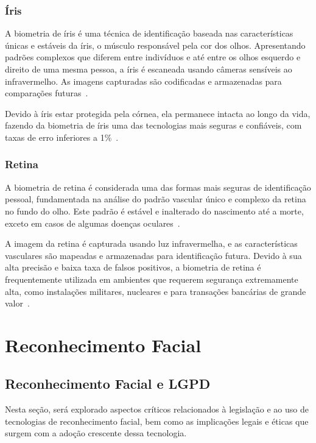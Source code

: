 \subsubsection{Íris}\label{subsubsec:iris}
A biometria de íris é uma técnica de identificação baseada nas características únicas e estáveis da íris, o músculo responsável pela cor dos olhos.
Apresentando padrões complexos que diferem entre indivíduos e até entre os olhos esquerdo e direito de uma mesma pessoa, a íris é escaneada usando câmeras sensíveis ao infravermelho.
As imagens capturadas são codificadas e armazenadas para comparações futuras~\cite{de2020biometria}.

Devido à íris estar protegida pela córnea, ela permanece intacta ao longo da vida, fazendo da biometria de íris uma das tecnologias mais seguras e confiáveis, com taxas de erro inferiores a 1\%~\cite{de2020biometria}.

\subsubsection{Retina}\label{subsubsec:retina}
A biometria de retina é considerada uma das formas mais seguras de identificação pessoal, fundamentada na análise do padrão vascular único e complexo da retina no fundo do olho.
Este padrão é estável e inalterado do nascimento até a morte, exceto em casos de algumas doenças oculares~\cite{de2020biometria}.

A imagem da retina é capturada usando luz infravermelha, e as características vasculares são mapeadas e armazenadas para identificação futura.
Devido à sua alta precisão e baixa taxa de falsos positivos, a biometria de retina é frequentemente utilizada em ambientes que requerem segurança extremamente alta, como instalações militares, nucleares e para transações bancárias de grande valor~\cite{de2020biometria}.


\section{Reconhecimento Facial}\label{sec:reconhecimento-facial}

\subsection{Reconhecimento Facial e LGPD}\label{subsec:lgpd}
Nesta seção, será explorado aspectos críticos relacionados à legislação e ao uso de tecnologias de reconhecimento facial, bem como as implicações legais e éticas que surgem com a adoção crescente dessa tecnologia.

